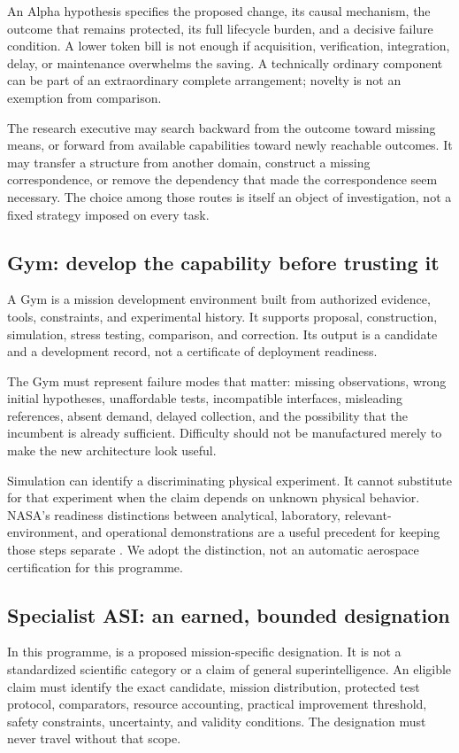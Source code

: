 An Alpha hypothesis specifies the proposed change, its causal mechanism, the outcome that remains protected, its full lifecycle burden, and a decisive failure condition. A lower token bill is not enough if acquisition, verification, integration, delay, or maintenance overwhelms the saving. A technically ordinary component can be part of an extraordinary complete arrangement; novelty is not an exemption from comparison.

The research executive may search backward from the outcome toward missing means, or forward from available capabilities toward newly reachable outcomes. It may transfer a structure from another domain, construct a missing correspondence, or remove the dependency that made the correspondence seem necessary. The choice among those routes is itself an object of investigation, not a fixed strategy imposed on every task.

\subsection{Gym: develop the capability before trusting it}
A Gym is a mission development environment built from authorized evidence, tools, constraints, and experimental history. It supports proposal, construction, simulation, stress testing, comparison, and correction. Its output is a candidate and a development record, not a certificate of deployment readiness.

The Gym must represent failure modes that matter: missing observations, wrong initial hypotheses, unaffordable tests, incompatible interfaces, misleading references, absent demand, delayed collection, and the possibility that the incumbent is already sufficient. Difficulty should not be manufactured merely to make the new architecture look useful.

Simulation can identify a discriminating physical experiment. It cannot substitute for that experiment when the claim depends on unknown physical behavior. NASA's readiness distinctions between analytical, laboratory, relevant-environment, and operational demonstrations are a useful precedent for keeping those steps separate \citep{nasaTRL}. We adopt the distinction, not an automatic aerospace certification for this programme.

\subsection{Specialist ASI: an earned, bounded designation}
In this programme, \spec{} is a proposed mission-specific designation. It is not a standardized scientific category or a claim of general superintelligence. An eligible claim must identify the exact candidate, mission distribution, protected test protocol, comparators, resource accounting, practical improvement threshold, safety constraints, uncertainty, and validity conditions. The designation must never travel without that scope.

